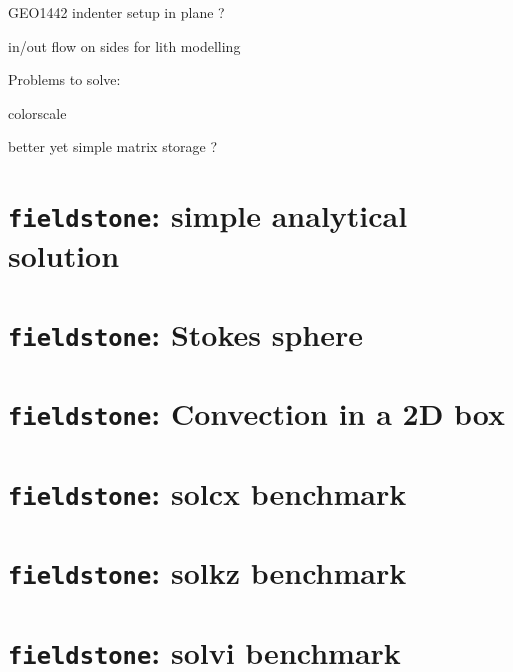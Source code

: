 \documentclass[a4paper]{article}
\begin{document}
GEO1442 indenter setup in plane ?

in/out flow on sides for lith modelling

\noindent Problems to solve:

colorscale 

better yet simple matrix storage ?


\newpage
\section{{\tt fieldstone}: simple analytical solution \label{f1}}


\newpage
\section{{\tt fieldstone}: Stokes sphere }


\newpage
\section{{\tt fieldstone}: Convection in a 2D box}


\newpage
\section{{\tt fieldstone}: solcx benchmark}


\newpage
\section{{\tt fieldstone}: solkz benchmark}


\newpage
\section{{\tt fieldstone}: solvi benchmark}

\end{document}
